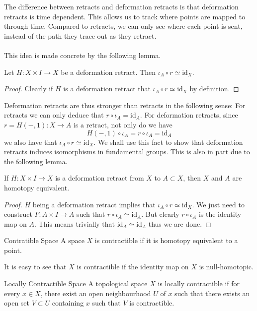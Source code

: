 \documentclass[a4paper]{article}
\begin{document}
The difference between retracts and deformation retracts is that deformation retracts is time dependent. This allows us to track where points are mapped to through time. Compared to retracts, we can only see where each point is sent, instead of the path they trace out as they retract. \\~\\

This idea is made concrete by the following lemma. 

\begin{lmm}{}{} Let $H:X\times I\to X$ be a deformation retract. Then $\iota_A\circ r\simeq\text{id}_X$. \tcbline
\begin{proof}
Clearly if $H$ is a deformation retract that $\iota_A\circ r\simeq\text{id}_X$ by definition. 
\end{proof}
\end{lmm}

Deformation retracts are thus stronger than retracts in the following sense: For retracts we can only deduce that $r\circ\iota_A=\text{id}_A$. For deformation retracts, since $r=H(-,1):X\to A$ is a retract, not only do we have $$H(-,1)\circ\iota_A=r\circ\iota_A=\text{id}_A$$ we also have that $\iota_A\circ r\simeq\text{id}_X$. We shall use this fact to show that deformation retracts induces isomorphisms in fundamental groups. This is also in part due to the following lemma. 

\begin{lmm}{}{} If $H:X\times I\to X$ is a deformation retract from $X$ to $A\subset X$, then $X$ and $A$ are homotopy equivalent. \tcbline
\begin{proof}
$H$ being a deformation retract implies that $\iota_A\circ r\simeq\text{id}_X$. We just need to construct $F:A\times I\to A$ such that $r\circ\iota_A\simeq\text{id}_A$. But clearly $r\circ\iota_A$ is the identity map on $A$. This means trivially that $\text{id}_A\simeq\text{id}_A$ thus we are done. 
\end{proof}
\end{lmm}

\begin{defn}{Contratible Space}{} A space $X$ is contractible if it is homotopy equivalent to a point. 
\end{defn}

It is easy to see that $X$ is contractible if the identity map on $X$ is null-homotopic. 

\begin{defn}{Locally Contractible Space}{} A topological space $X$ is locally contractible if for every $x\in X$, there exist an open neighbourhood $U$ of $x$ such that there exists an open set $V\subset U$ containing $x$ such that $V$ is contractible. 
\end{defn}
\end{document}
